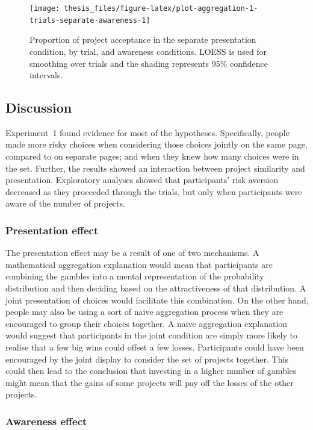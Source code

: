 \documentclass[a4paper, nobind, dvipsnames]{templates/ociamthesis}
\theoremstyle{definition}
\theoremstyle{definition}
\theoremstyle{definition}
\theoremstyle{definition}
\theoremstyle{remark}
\begin{document}
\begin{figure}
\texttt{[image: thesis\_files/figure-latex/plot-aggregation-1-trials-separate-awareness-1]} \caption{Proportion of project acceptance in the separate presentation condition, by trial, and awareness conditions. LOESS is used for smoothing over trials and the shading represents 95\% confidence intervals.}\label{fig:plot-aggregation-1-trials-separate-awareness}
\end{figure}

\hypertarget{discussion-aggregation-1}{%
\subsection{Discussion}\label{discussion-aggregation-1}}

Experiment~1 found evidence for most of the hypotheses. Specifically, people
made more risky choices when considering those choices jointly on the same page,
compared to on separate pages; and when they knew how many choices were in the
set. Further, the results showed an interaction between project similarity and
presentation. Exploratory analyses showed that participants' risk aversion
decreased as they proceeded through the trials, but only when participants were
aware of the number of projects.

\subsubsection{Presentation effect}

The presentation effect may be a result of one of two mechanisms. A mathematical
aggregation explanation would mean that participants are combining the gambles
into a mental representation of the probability distribution and then deciding
based on the attractiveness of that distribution. A joint presentation of
choices would facilitate this combination. On the other hand, people may also be
using a sort of naive aggregation process when they are encouraged to group
their choices together. A naive aggregation explanation would suggest that
participants in the joint condition are simply more likely to realise that a few
big wins could offset a few losses. Participants could have been encouraged by
the joint display to consider the set of projects together. This could then lead
to the conclusion that investing in a higher number of gambles might mean that
the gains of some projects will pay off the losses of the other projects.

\subsubsection{Awareness effect}
\end{document}
